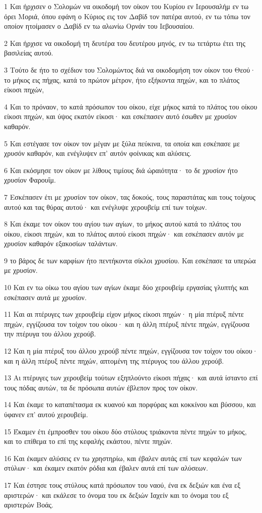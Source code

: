 \par 1 Και ήρχισεν ο Σολομών να οικοδομή τον οίκον του Κυρίου εν Ιερουσαλήμ εν τω όρει Μοριά, όπου εφάνη ο Κύριος εις τον Δαβίδ τον πατέρα αυτού, εν τω τόπω τον οποίον ητοίμασεν ο Δαβίδ εν τω αλωνίω Ορνάν του Ιεβουσαίου.
\par 2 Και ήρχισε να οικοδομή τη δευτέρα του δευτέρου μηνός, εν τω τετάρτω έτει της βασιλείας αυτού.
\par 3 Τούτο δε ήτο το σχέδιον του Σολομώντος διά να οικοδομήση τον οίκον του Θεού· το μήκος εις πήχας, κατά το πρώτον μέτρον, ήτο εξήκοντα πηχών, και το πλάτος είκοσι πηχών,
\par 4 Και το πρόναον, το κατά πρόσωπον του οίκου, είχε μήκος κατά το πλάτος του οίκου είκοσι πηχών, και ύψος εκατόν είκοσι· και εσκέπασεν αυτό έσωθεν με χρυσίον καθαρόν.
\par 5 Και εστέγασε τον οίκον τον μέγαν με ξύλα πεύκινα, τα οποία και εσκέπασε με χρυσόν καθαρόν, και ενέγλυψεν επ' αυτόν φοίνικας και αλύσεις.
\par 6 Και εκόσμησε τον οίκον με λίθους τιμίους διά ώραιότητα· το δε χρυσίον ήτο χρυσίον Φαρουΐμ.
\par 7 Εσκέπασεν έτι με χρυσίον τον οίκον, τας δοκούς, τους παραστάτας και τους τοίχους αυτού και τας θύρας αυτού· και ενέγλυψε χερουβείμ επί των τοίχων.
\par 8 Και έκαμε τον οίκον του αγίου των αγίων, το μήκος αυτού κατά το πλάτος του οίκου, είκοσι πηχών, και το πλάτος αυτού είκοσι πηχών· και εσκέπασεν αυτόν με χρυσίον καθαρόν εξακοσίων ταλάντων.
\par 9 το βάρος δε των καρφίων ήτο πεντήκοντα σίκλοι χρυσίου. Και εσκέπασε τα υπερώα με χρυσίον.
\par 10 Και εν τω οίκω του αγίου των αγίων έκαμε δύο χερουβείμ εργασίας γλυπτής και εσκέπασεν αυτά με χρυσίον.
\par 11 Και αι πτέρυγες των χερουβείμ είχον μήκος είκοσι πηχών· η μία πτέρυξ πέντε πηχών, εγγίζουσα τον τοίχον του οίκου· και η άλλη πτέρυξ πέντε πηχών, εγγίζουσα την πτέρυγα του άλλου χερούβ.
\par 12 Και η μία πτέρυξ του άλλου χερούβ πέντε πηχών, εγγίζουσα τον τοίχον του οίκου· και η άλλη πτέρυξ πέντε πηχών, απτομένη της πτέρυγος του άλλου χερούβ.
\par 13 Αι πτέρυγες των χερουβείμ τούτων εξηπλούντο είκοσι πήχας· και αυτά ίσταντο επί τους πόδας αυτών, τα δε πρόσωπα αυτών έβλεπον προς τον οίκον.
\par 14 Και έκαμε το καταπέτασμα εκ κυανού και πορφύρας και κοκκίνου και βύσσου, και ύφανεν επ' αυτού χερουβείμ.
\par 15 Έκαμεν έτι έμπροσθεν του οίκου δύο στύλους τριάκοντα πέντε πηχών το μήκος, και το επίθεμα το επί της κεφαλής εκάστου, πέντε πηχών.
\par 16 Και έκαμεν αλύσεις εν τω χρηστηρίω, και έβαλεν αυτάς επί των κεφαλών των στύλων· και έκαμεν εκατόν ρόδια και έβαλεν αυτά επί των αλύσεων.
\par 17 Και έστησε τους στύλους κατά πρόσωπον του ναού, ένα εκ δεξιών και ένα εξ αριστερών· και εκάλεσε το όνομα του εκ δεξιών Ιαχείν και το όνομα του εξ αριστερών Βοάς.

